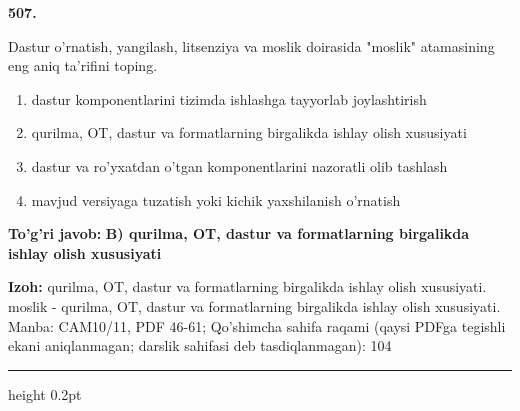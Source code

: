 \documentclass[10pt,a4paper]{article}
\begin{document}
{\bfseries\sffamily\color{ink} 507.}
\par
Dastur o'rnatish, yangilash, litsenziya va moslik doirasida "moslik" atamasining eng aniq ta'rifini toping.
\begin{enumerate}[label=\Alph*),leftmargin=9mm]
\item dastur komponentlarini tizimda ishlashga tayyorlab joylashtirish
\item qurilma, OT, dastur va formatlarning birgalikda ishlay olish xususiyati
\item dastur va ro'yxatdan o'tgan komponentlarini nazoratli olib tashlash
\item mavjud versiyaga tuzatish yoki kichik yaxshilanish o'rnatish
\end{enumerate}
\begin{tcolorbox}[enhanced,breakable,colback=teal!4,colframe=teal!60!black,boxrule=0.45pt,arc=1.2mm,left=2.7mm,right=2.7mm,top=1.8mm,bottom=1.8mm,before skip=2mm,after skip=2mm]
{\bfseries\sffamily\color{teal}To'g'ri javob:} \textbf{B) qurilma, OT, dastur va formatlarning birgalikda ishlay olish xususiyati}
\par\smallskip
{\bfseries Izoh:} qurilma, OT, dastur va formatlarning birgalikda ishlay olish xususiyati. moslik - qurilma, OT, dastur va formatlarning birgalikda ishlay olish xususiyati. Manba: CAM10/11, PDF 46-61; Qo'shimcha sahifa raqami (qaysi PDFga tegishli ekani aniqlanmagan; darslik sahifasi deb tasdiqlanmagan): 104
\end{tcolorbox}
\vspace{2mm}\hrule height 0.2pt\vspace{3mm}
\end{document}

